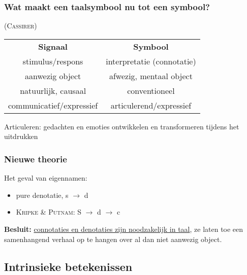 \documentclass[11pt,a4paper]{article}
\begin{document}
\subsubsection*{Wat maakt een taalsymbool nu tot een symbool? } (\textsc{Cassirer})
\begin{center}
\begin{tabular}{c c}
\textbf{Signaal} & \textbf{Symbool}\\
stimulus/respons & interpretatie (connotatie)\\
aanwezig object & afwezig, mentaal object\\
natuurlijk, causaal & conventioneel\\
communicatief/expressief & articulerend/expressief\\
\end{tabular}
\end{center}

Articuleren: gedachten en emoties ontwikkelen en transformeren tijdens het uitdrukken


\subsubsection*{Nieuwe theorie}
Het geval van eigennamen:
\begin{itemize}
\item pure denotatie, s $\rightarrow$ d
\item \textsc{Kripke \& Putnam}: S $\rightarrow$ d $\rightarrow$ c
\end{itemize}

\textbf{Besluit:} \underline{connotaties en denotaties zijn noodzakelijk in taal}, ze laten toe een samenhangend verhaal op te hangen over al dan niet aanwezig object.

\subsection{Intrinsieke betekenissen}
\end{document}
